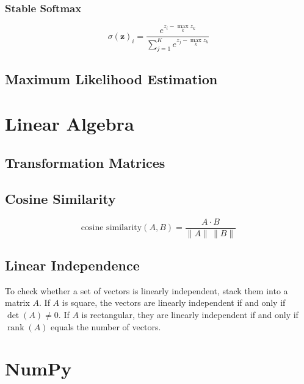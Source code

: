 \documentclass{article}
\begin{document}
\subsubsection{Stable Softmax}\label{subsubsec:prob-stat:softmax:stable}
\begin{equation}
    \label{eq:stable-softmax}
    \sigma(\mathbf{z})_i = \frac{e^{z_i - \max_k z_k}}{\sum_{j=1}^{K} e^{z_j - \max_k z_k}}
\end{equation}

\subsection{Maximum Likelihood Estimation}
\label{subsec:prob-stat:maximum-likelihood-estimation}

\section{Linear Algebra}
\label{sec:linear-algebra}

\subsection{Transformation Matrices}
\label{subsec:linear-algebra:transformation-matrices}

\subsection{Cosine Similarity}
\label{subsec:linear-algebra:cosine-similarity}
\begin{equation}
    \label{eq:cosine-similarity}
    \text{cosine similarity}(A, B) = \frac{A \cdot B}{\lVert A \rVert \, \lVert B \rVert}
\end{equation}

\subsection{Linear Independence}
\label{subsec:linear-algebra:linear-independence}
To check whether a set of vectors is linearly independent, stack them into a matrix $A$. If $A$ is square, the vectors are linearly independent if and only if $\det(A) \neq 0$. If $A$ is rectangular, they are linearly independent if and only if $\operatorname{rank}(A)$ equals the number of vectors.

\section{NumPy}
\label{sec:numpy}
\end{document}
